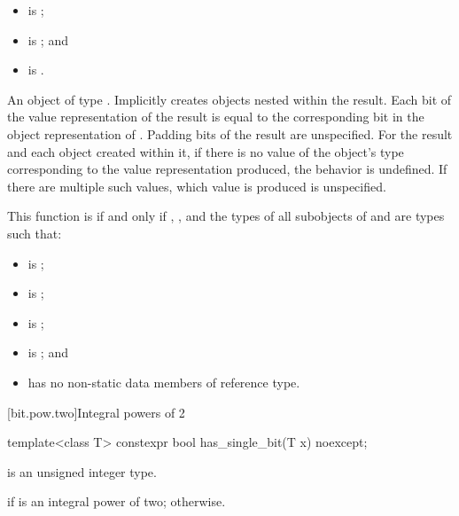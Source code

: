 \begin{itemdescr}
\pnum
\constraints
\begin{itemize}
\item {} is ;
\item {} is ; and
\item {} is .
\end{itemize}

\pnum
\returns
An object of type .
Implicitly creates objects nested within the result.
Each bit of the value representation of the result
is equal to the corresponding bit in the object representation
of . Padding bits of the result are unspecified.
For the result and each object created within it,
if there is no value of the object's type corresponding to the
value representation produced, the behavior is undefined.
If there are multiple such values, which value is produced is unspecified.

\pnum
\remarks
This function is  if and only if
, , and the types of all subobjects
of  and  are types  such that:
\begin{itemize}
\item {} is ;
\item {} is ;
\item {} is ;
\item {} is ; and
\item {} has no non-static data members of reference type.
\end{itemize}
\end{itemdescr}

[bit.pow.two]{Integral powers of 2}

%
\begin{itemdecl}
template<class T>
  constexpr bool has_single_bit(T x) noexcept;
\end{itemdecl}

\begin{itemdescr}
\pnum
\constraints
{} is an unsigned integer type.

\pnum
\returns
{} if  is an integral power of two;
 otherwise.

\end{itemdescr}

